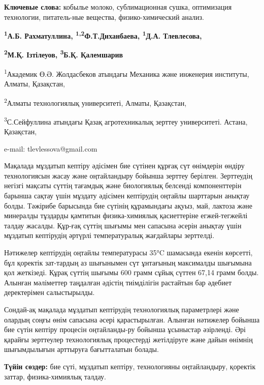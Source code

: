 {\bfseries Ключевые слова:} кобылье молоко, сублимационная сушка,
оптимизация технологии, питатель-ные вещества, физико-химический анализ.

\begin{center}

{\bfseries \textsuperscript{1}А.Б. Рахматуллина,
\textsuperscript{1,2}Ф.Т.Диханбаева, \textsuperscript{1}Д.А.
Тлевлесова\envelope,}

{\bfseries \textsuperscript{2}М.Қ. Ізтілеуов, \textsuperscript{3}Б.Қ.
Қалемшарив}

\textsuperscript{1}Академик Ө.Ә. Жолдасбеков атындағы Механика және
инженерия институты, Алматы, Қазақстан,

\textsuperscript{2}Алматы технологиялық университеті, Алматы, Қазақстан,

\textsuperscript{3}С.Сейфуллина атындағы Қазақ агротехникалық зерттеу
университеті. Астана, Қазақстан,

e-mail: tlevlessova@gmail.com
\end{center}

Мақалада мұздатып кептіру әдісімен бие сүтінен құрғақ сүт өнімдерін
өндіру технологиясын жасау және оңтайландыру бойынша зерттеу берілген.
Зерттеудің негізгі мақсаты сүттің тағамдық және биологиялық белсенді
компоненттерін барынша сақтау үшін мұздату әдісімен кептірудің оңтайлы
шарттарын анықтау болды. Тәжірибе барысында бие сүтінің құрамындағы
ақуыз, май, лактоза және минералды тұздарды қамтитын физика-химиялық
қасиеттеріне егжей-тегжейлі талдау жасалды. Құр-ғақ сүттің шығымы мен
сапасына әсерін анықтау үшін мұздатып кептірудің әртүрлі температуралық
жағдайлары зерттелді.

Нәтижелер кептірудің оңтайлы температурасы 35°C шамасында екенін
көрсетті, бұл қоректік зат-тардың аз шығынымен сүт ұнтағының максималды
шығымына қол жеткізеді. Құрақ сүттің шығымы 600 грамм сұйық сүттен 67,14
грамм болды. Алынған мәліметтер таңдалған әдістің тиімділігін растайтын
бар әдебиет деректерімен салыстырылды.

Сондай-ақ мақалада мұздатып кептірудің технологиялық параметрлері және
олардың соңғы өнім сапасына әсері қарастырылған. Алынған нәтижелер
бойынша бие сүтін кептіру процесін оңтайланды-ру бойынша ұсыныстар
әзірленді. Әрі қарайғы зерттеулер технологиялық процестерді жетілдіруге
және дайын өнімнің шығымдылығын арттыруға бағытталатын болады.

{\bfseries Түйін сөздер:} бие сүті, мұздатып кептіру, технологияны
оңтайландыру, қоректік заттар, физика-химиялық талдау.

